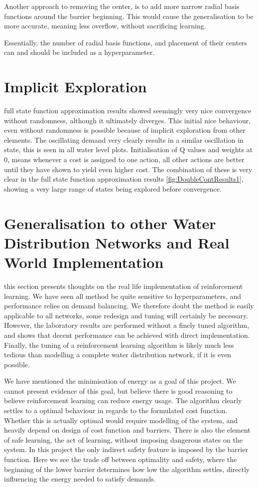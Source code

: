Another approach to removing the center, is to add more narrow radial basis functions around the barrier beginning. This would cause the generalisation to be more accurate, meaning less overflow, without sacrificing learning.

Essentially, the number of radial basis functions, and placement of their centers can and should be included as a hyperparameter.


\section{Implicit Exploration}
full state function approximation results showed seemingly very nice convergence without randomness, although it ultimately diverges. This initial nice behaviour, even without randomness is possible because of implicit exploration from other elements. The oscillating demand very clearly results in a similar oscillation in state, this is seen in all water level plots. Initialisation of Q values and weights at 0, means whenever a cost is assigned to one action, all other actions are better until they have shown to yield even higher cost. The combination of these is very clear in the full state function approximation results \cref{fig:DoubleContResults1}, showing a very large range of states being explored before convergence.

\section{Generalisation to other Water Distribution Networks and Real World Implementation}
this section presents thoughts on the real life implementation of reinforcement learning. We have seen all method be quite sensitive to hyperparameters, and performance relies on demand balancing. We therefore doubt the method is easily applicable to all networks, some redesign and tuning will certainly be necessary. However, the laboratory results are performed without a finely tuned algorithm, and shows that decent performance can be achieved with direct implementation. Finally, the tuning of a reinforcement learning algorithm is likely much less tedious than modelling a complete water distribution network, if it is even possible.

We have mentioned the minimisation of energy as a goal of this project. We cannot present evidence of this goal, but believe there is good reasoning to believe reinforcement learning can reduce energy usage. The algorithm clearly settles to a optimal behaviour in regards to the formulated cost function. Whether this is actually optimal would require modelling of the system, and heavily depend on design of cost function and barriers. There is also the element of safe learning, the act of learning, without imposing dangerous states on the system. In this project the only indirect safety feature is imposed by the barrier function. Here we see the trade off between optimality and safety,  where the beginning of the lower barrier determines how low the algorithm settles, directly influencing the energy needed to satisfy demands.

